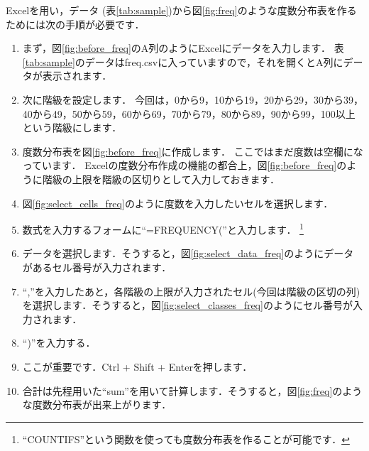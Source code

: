 Excelを用い，データ (表\ref{tab:sample})から図\ref{fig:freq}のような度数分布表を作るためには次の手順が必要です．

\begin{enumerate}
    \item まず，図\ref{fig:before_freq}のA列のようにExcelにデータを入力します．
    表\ref{tab:sample}のデータはfreq.csvに入っていますので，それを開くとA列にデータが表示されます．
    \item 次に階級を設定します．
    今回は，0から9，10から19，20から29，30から39，40から49，50から59，60から69，70から79，80から89，90から99，100以上という階級にします．
    \item 度数分布表を図\ref{fig:before_freq}に作成します．
    ここではまだ度数は空欄になっています．
    Excelの度数分布作成の機能の都合上，図\ref{fig:before_freq}のように階級の上限を階級の区切りとして入力しておきます．
    \item 図\ref{fig:select_cells_freq}のように度数を入力したいセルを選択します．
    \item 数式を入力するフォームに``=FREQUENCY(''と入力します．
    \footnote{``COUNTIFS''という関数を使っても度数分布表を作ることが可能です．}
    \item データを選択します．そうすると，図\ref{fig:select_data_freq}のようにデータがあるセル番号が入力されます．
    \item ``,''を入力したあと，各階級の上限が入力されたセル(今回は階級の区切の列)を選択します．そうすると，図\ref{fig:select_classes_freq}のようにセル番号が入力されます．
    \item ``)''を入力する．
    \item ここが重要です．Ctrl + Shift + Enterを押します．
    \item 合計は先程用いた``sum''を用いて計算します．そうすると，図\ref{fig:freq}のような度数分布表が出来上がります．
\end{enumerate}


